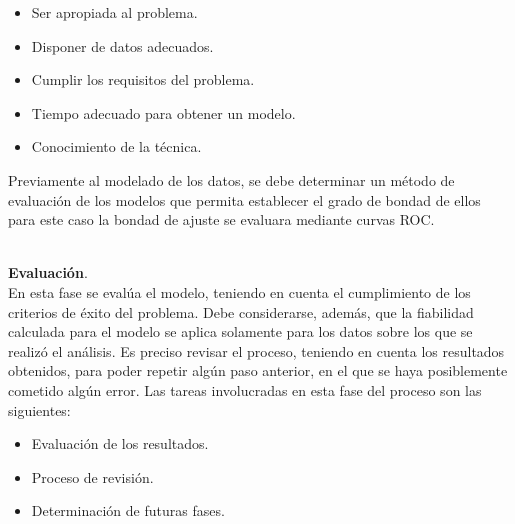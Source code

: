 \begin{itemize}
\item	Ser apropiada al problema.
\item	Disponer de datos adecuados.
\item	Cumplir los requisitos del problema.
\item	Tiempo adecuado para obtener un modelo.
\item	Conocimiento de la técnica.
\end{itemize}

Previamente al modelado de los datos, se debe determinar un método de evaluación de los modelos que permita establecer el grado de bondad de ellos para este caso la bondad de ajuste se evaluara mediante curvas ROC.\\\

\noindent
\textbf{Evaluación}.\\

	En esta fase se evalúa el modelo, teniendo en cuenta el cumplimiento de los criterios de éxito del problema. Debe considerarse, además, que la fiabilidad calculada para el modelo se aplica solamente para los datos sobre los que se realizó el análisis. Es preciso revisar el proceso, teniendo en cuenta los resultados obtenidos, para poder repetir algún paso anterior, en el que se haya posiblemente cometido algún error. Las tareas involucradas en esta fase del proceso son las siguientes:\\

\begin{itemize}
\item	Evaluación de los resultados.
\item	Proceso de revisión.
\item	Determinación de futuras fases.
\end{itemize}


